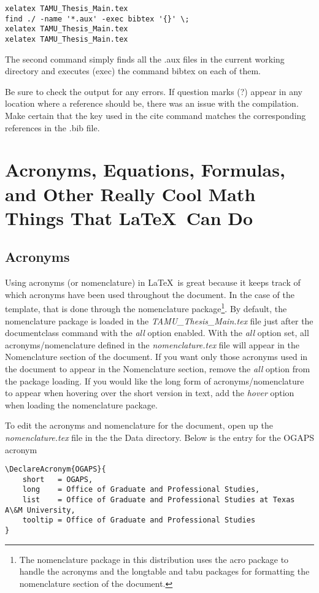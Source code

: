 \begin{verbatim}
xelatex TAMU_Thesis_Main.tex
find ./ -name '*.aux' -exec bibtex '{}' \;
xelatex TAMU_Thesis_Main.tex
xelatex TAMU_Thesis_Main.tex
\end{verbatim}

The second command simply finds all the .aux files in the current working directory and executes (exec) the command bibtex on each of them.

Be sure to check the output for any errors. If question marks (?) appear in any location where a reference should be, there was an issue with the compilation. Make certain that the key used in the cite command matches the corresponding references in the .bib file.

\section{Acronyms, Equations, Formulas, and Other Really Cool Math Things That \LaTeX\ Can Do}
\subsection{Acronyms}
Using acronyms (or nomenclature) in \LaTeX\ is great because it keeps track of which acronyms have been used throughout the document. In the case of the template, that is done through the nomenclature package\footnote{The nomenclature package in this distribution uses the acro package to handle the acronyms and the longtable and tabu packages for formatting the nomenclature section of the document.}. By default, the nomenclature package is loaded in the {\it TAMU\_Thesis\_Main.tex} file just after the documentclass command with the {\it all} option enabled. With the {\it all} option set, all acronyms/nomenclature defined in the {\it nomenclature.tex} file will appear in the Nomenclature section of the document. If you want only those acronyms used in the document to appear in the Nomenclature section, remove the {\it all} option from the package loading. If you would like the long form of acronyms/nomenclature to appear when hovering over the short version in text, add the {\it hover} option when loading the nomenclature package.

To edit the acronyms and nomenclature for the document, open up the {\it nomenclature.tex} file in the the Data directory. Below is the entry for the OGAPS acronym
\newpage %

{\small \begin{verbatim}
\DeclareAcronym{OGAPS}{
	short   = OGAPS,
	long    = Office of Graduate and Professional Studies,
	list    = Office of Graduate and Professional Studies at Texas A\&M University,
	tooltip = Office of Graduate and Professional Studies
}
\end{verbatim}}

